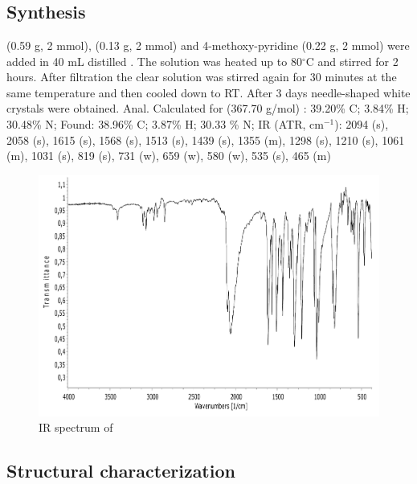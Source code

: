 \section{\ce{[Zn(N_3)_2(4-methoxypyridine)_2]}}
\subsection{Synthesis}
 (0.59 g, 2 mmol),  (0.13 g, 2 mmol) and  4-methoxy-pyridine (0.22 g, 2 mmol) were added in 40 mL distilled . The solution was heated up to 80$^\circ$C  and stirred for 2 hours. After filtration the clear solution was stirred again for 30 minutes at the same temperature and then cooled down to RT. After 3 days needle-shaped white crystals were obtained. Anal. Calculated for  (367.70 g/mol) : 39.20\% C; 3.84\% H; 30.48\% N; Found: 38.96\% C; 3.87\% H; 30.33 \% N; IR (ATR, cm$^{-1}$): 2094 (s), 2058 (s), 1615 (s), 1568 (s), 1513 (s), 1439 (s), 1355 (m), 1298 (s), 1210 (s), 1061 (m), 1031 (s), 819 (s), 731 (w), 659 (w), 580 (w), 535 (s), 465 (m)

\begin{figure}[h!]
\centering
\includegraphics[width=1\textwidth]{figures/ZnA4MOP-IR.pdf}
\caption{IR spectrum of \ce{[Zn(N_3)_2(4-MeOpy)_2]}}
\end{figure}

\subsection{Structural characterization}

